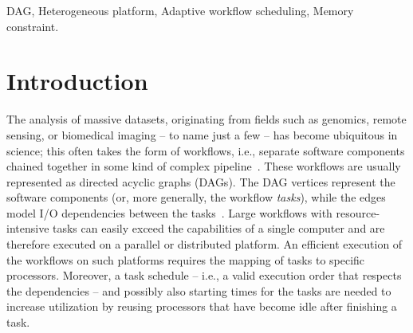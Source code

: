 \documentclass[conference]{IEEEtran}
\newcommand{\new}[1]{{#1}}
\newcommand{\skug}[1]{{\color{blue}[SK: #1]}}
\renewcommand{\iec}{i.e., }
\begin{document}
\begin{abstract}

\end{abstract}

    \begin{IEEEkeywords}
        DAG, Heterogeneous platform, Adaptive \new{workflow} scheduling, Memory constraint.
    \end{IEEEkeywords}

\section{Introduction} %

The analysis of massive datasets, originating from fields such as genomics, 
remote sensing, or biomedical imaging -- to name just a few -- has become ubiquitous in science;
this often takes the form of workflows, \iec separate software components chained together
in some kind of complex pipeline~\cite{DBLP:journals/dbsk/LeserHDEGHKKKKK21}.
These workflows are usually represented as directed acyclic graphs (DAGs).
The DAG vertices represent the software components (or, more generally, the workflow \emph{tasks}),
while the edges model I/O dependencies between the tasks~\cite{adhikari2019survey,liu2018survey}.
Large workflows with resource-intensive tasks can easily exceed the capabilities of a 
single computer and are therefore executed on a parallel or distributed platform.
An efficient execution of the workflows on such platforms requires the mapping of tasks
to specific processors.
\new{Moreover, a task schedule -- \iec a valid execution order that respects the dependencies --
and possibly also starting times for the tasks are needed to increase utilization by reusing 
processors that have become idle after finishing a task.}
\end{document}
